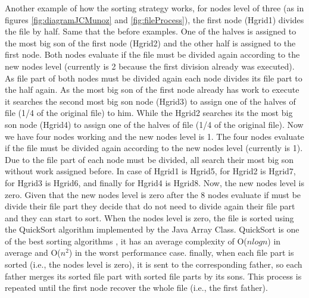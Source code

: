 Another example of how the sorting strategy works, for nodes level of three (as in figures \ref{fig:diagramJCMunoz} and \ref{fig:fileProcess}), the first node (Hgrid1) divides the file by half. Same that the before examples. One of the halves is assigned to the most big son of the first node (Hgrid2) and the other half is assigned to the first node. Both nodes evaluate if the file must be divided again according to the new nodes level (currently is 2 because the first division already was executed). As file part of both nodes must be divided again each node divides its file part to the half again. As the most big son of the first node already has work to execute it searches the second most big son node (Hgrid3) to assign one of the halves of file (1/4 of the original file) to him. While the Hgrid2 searches its the most big son node (Hgrid4) to assign one of the halves of file (1/4 of the original file). Now we have four nodes working and the new nodes level is 1. The four nodes evaluate if the file must be divided again according to the new nodes level (currently is 1). Due to the file part of each node must be divided, all search their most big son without work assigned before. In case of Hgrid1 is Hgrid5, for Hgrid2 is Hgrid7, for Hgrid3 is Hgrid6, and finally for Hgrid4 is Hgrid8. Now, the new nodes level is zero. Given that the new nodes level is zero after the 8 nodes evaluate if must be divide their file part they decide that do not need to divide again their file part and they can start to sort. When the nodes level is zero, the file is sorted using the QuickSort algorithm implemented by the Java Array Class. QuickSort is one of the best sorting algorithms \cite{TheTop10Algorithms}, it has an average complexity of O($n log n$) in average and O($ n^{2} $) in the worst performance case. finally, when each file part is sorted (i.e., the nodes level is zero), it is sent to the corresponding father, so each father merges its sorted file part with sorted file parts by its sons. This process is repeated until the first node recover the whole file (i.e., the first father).


